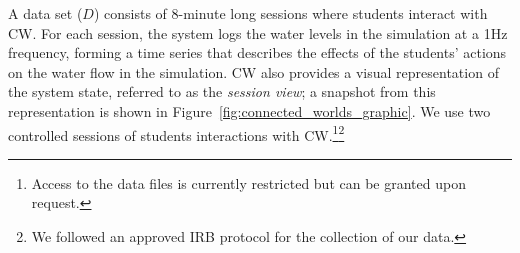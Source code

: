 \documentclass[letterpaper]{article} %
\begin{document}
A data set ($D$) consists of 8-minute long sessions where students interact with CW.
For each session, the system logs the water levels in the simulation at a 1Hz frequency, forming a time series that describes the effects of the students' actions on the water flow in the simulation.
CW also provides
a visual representation of the system state, referred to as the \emph{session view}; a snapshot from this representation is shown in Figure~\ref{fig:connected_worlds_graphic}.
We use two controlled sessions of students interactions with CW.\footnote{Access to the data files is currently restricted but can be granted upon request.}\footnote{We followed an approved IRB protocol for the collection of our data.}




\end{document}
